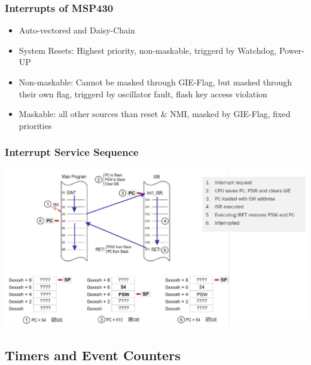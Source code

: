 \subsubsection{Interrupts of MSP430 }
\begin{itemize}
	\item Auto-vectored and Daisy-Chain
	\item System Resets: Highest priority, non-maskable, triggerd by Watchdog, Power-UP
	\item Non-maskable: Cannot be masked through GIE-Flag, but masked through their own flag, triggerd by oscillator fault, flash key access violation
	\item Maskable: all other sources than reset \& NMI, masked by GIE-Flag, fixed priorities
\end{itemize}
\subsubsection{Interrupt Service Sequence}
\includegraphics[width=16cm]{images/iss.png}

\subsection{Timers and Event Counters }
